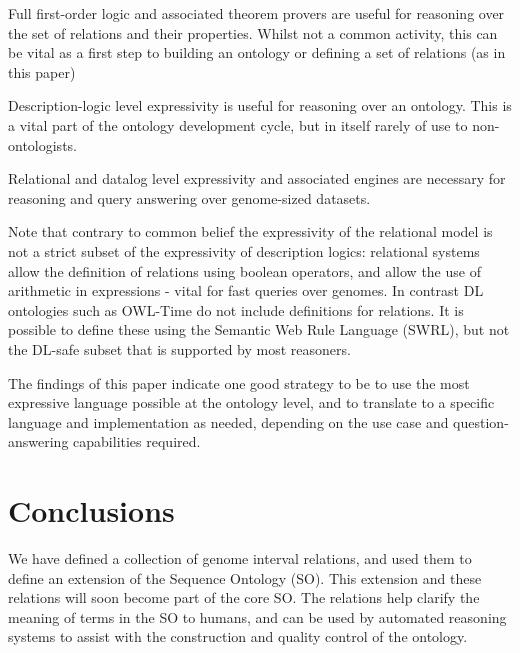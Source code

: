 \documentclass{article}
\begin{document}
\begin{clist}

\item Full first-order logic and associated theorem provers are useful
  for reasoning over the set of relations and their properties. Whilst
  not a common activity, this can be vital as a first step to building
  an ontology or defining a set of relations (as in this paper)

\item Description-logic level expressivity is useful for reasoning
  over an ontology. This is a vital part of the ontology development
  cycle, but in itself rarely of use to non-ontologists.

\item Relational and datalog level expressivity and associated engines
  are necessary for reasoning and query answering over genome-sized
  datasets.

\end{clist}

Note that contrary to common belief the expressivity of the relational
model is not a strict subset of the expressivity of description
logics: relational systems allow the definition of relations using
boolean operators, and allow the use of arithmetic in expressions -
vital for fast queries over genomes. In contrast DL ontologies such as
OWL-Time\cite{OWLTime} do not include definitions for relations. It is
possible to define these using the Semantic Web Rule Language (SWRL),
but not the DL-safe subset that is supported by most reasoners.

The findings of this paper indicate one good strategy to be to use the
most expressive language possible at the ontology level, and to
translate to a specific language and implementation as needed,
depending on the use case and question-answering capabilities required.

\section{Conclusions}

We have defined a collection of genome interval relations, and used
them to define an extension of the Sequence Ontology (SO). This
extension and these relations will soon become part of the core
SO. The relations help clarify the meaning of terms in the SO to
humans, and can be used by automated reasoning systems to assist with
the construction and quality control of the ontology.
\end{document}

